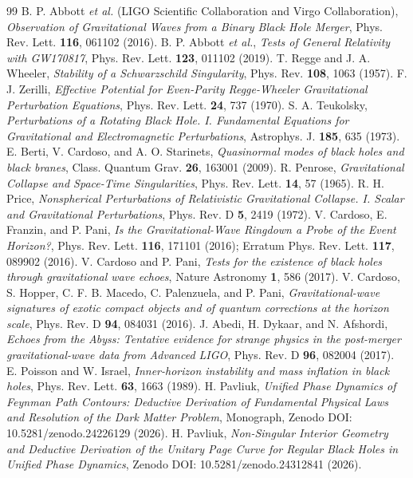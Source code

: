 \documentclass[11pt,a4paper]{article}
\begin{document}
\begin{thebibliography}{99}
 B. P. Abbott \textit{et al.} (LIGO Scientific Collaboration and Virgo Collaboration), \textit{Observation of Gravitational Waves from a Binary Black Hole Merger}, Phys. Rev. Lett. \textbf{116}, 061102 (2016).
 B. P. Abbott \textit{et al.}, \textit{Tests of General Relativity with GW170817}, Phys. Rev. Lett. \textbf{123}, 011102 (2019).
 T. Regge and J. A. Wheeler, \textit{Stability of a Schwarzschild Singularity}, Phys. Rev. \textbf{108}, 1063 (1957).
 F. J. Zerilli, \textit{Effective Potential for Even-Parity Regge-Wheeler Gravitational Perturbation Equations}, Phys. Rev. Lett. \textbf{24}, 737 (1970).
 S. A. Teukolsky, \textit{Perturbations of a Rotating Black Hole. I. Fundamental Equations for Gravitational and Electromagnetic Perturbations}, Astrophys. J. \textbf{185}, 635 (1973).
 E. Berti, V. Cardoso, and A. O. Starinets, \textit{Quasinormal modes of black holes and black branes}, Class. Quantum Grav. \textbf{26}, 163001 (2009).
 R. Penrose, \textit{Gravitational Collapse and Space-Time Singularities}, Phys. Rev. Lett. \textbf{14}, 57 (1965).
 R. H. Price, \textit{Nonspherical Perturbations of Relativistic Gravitational Collapse. I. Scalar and Gravitational Perturbations}, Phys. Rev. D \textbf{5}, 2419 (1972).
 V. Cardoso, E. Franzin, and P. Pani, \textit{Is the Gravitational-Wave Ringdown a Probe of the Event Horizon?}, Phys. Rev. Lett. \textbf{116}, 171101 (2016); Erratum Phys. Rev. Lett. \textbf{117}, 089902 (2016).
 V. Cardoso and P. Pani, \textit{Tests for the existence of black holes through gravitational wave echoes}, Nature Astronomy \textbf{1}, 586 (2017).
 V. Cardoso, S. Hopper, C. F. B. Macedo, C. Palenzuela, and P. Pani, \textit{Gravitational-wave signatures of exotic compact objects and of quantum corrections at the horizon scale}, Phys. Rev. D \textbf{94}, 084031 (2016).
 J. Abedi, H. Dykaar, and N. Afshordi, \textit{Echoes from the Abyss: Tentative evidence for strange physics in the post-merger gravitational-wave data from Advanced LIGO}, Phys. Rev. D \textbf{96}, 082004 (2017).
 E. Poisson and W. Israel, \textit{Inner-horizon instability and mass inflation in black holes}, Phys. Rev. Lett. \textbf{63}, 1663 (1989).
 H. Pavliuk, \textit{Unified Phase Dynamics of Feynman Path Contours: Deductive Derivation of Fundamental Physical Laws and Resolution of the Dark Matter Problem}, Monograph, Zenodo DOI: 10.5281/zenodo.24226129 (2026).
 H. Pavliuk, \textit{Non-Singular Interior Geometry and Deductive Derivation of the Unitary Page Curve for Regular Black Holes in Unified Phase Dynamics}, Zenodo DOI: 10.5281/zenodo.24312841 (2026).
\end{thebibliography}
\end{document}
